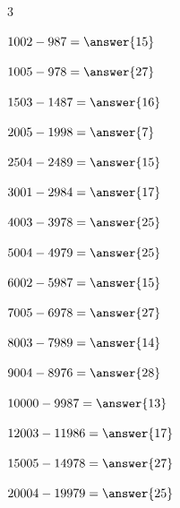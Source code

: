 \documentclass{ximera}
\begin{document}
\begin{oefening}{\oefB}
\begin{multicols}{3}
\begin{question} \(1002-987=\answer{15}\) \end{question}

\begin{question} \(1005-978=\answer{27}\) \end{question}

\begin{question} \(1503-1487=\answer{16}\) \end{question}

\begin{question} \(2005-1998=\answer{7}\) \end{question}

\begin{question} \(2504-2489=\answer{15}\) \end{question}

\begin{question} \(3001-2984=\answer{17}\) \end{question}

\begin{question} \(4003-3978=\answer{25}\) \end{question}

\begin{question} \(5004-4979=\answer{25}\) \end{question}

\begin{question} \(6002-5987=\answer{15}\) \end{question}

\begin{question} \(7005-6978=\answer{27}\) \end{question}

\begin{question} \(8003-7989=\answer{14}\) \end{question}

\begin{question} \(9004-8976=\answer{28}\) \end{question}

\begin{question} \(10000-9987=\answer{13}\) \end{question}

\begin{question} \(12003-11986=\answer{17}\) \end{question}

\begin{question} \(15005-14978=\answer{27}\) \end{question}

\begin{question} \(20004-19979=\answer{25}\) \end{question}

\end{multicols}

\end{oefening}
\end{document}

